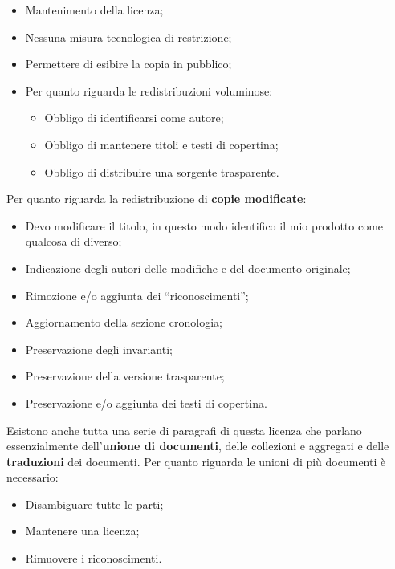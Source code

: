 \begin{itemize}

\item Mantenimento della licenza;
\item Nessuna misura tecnologica di restrizione;
\item Permettere di esibire la copia in pubblico;
\item Per quanto riguarda le redistribuzioni voluminose:
	\begin{itemize}

	\item Obbligo di identificarsi come autore;
	\item Obbligo di mantenere titoli e testi di copertina;
	\item Obbligo di distribuire una sorgente trasparente.

	\end{itemize}

\end{itemize}

Per quanto riguarda la redistribuzione di \textbf{copie modificate}:

\begin{itemize}

\item Devo modificare il titolo, in questo modo identifico il mio prodotto come qualcosa di diverso;
\item Indicazione degli autori delle modifiche e del documento originale;
\item Rimozione e/o aggiunta dei ``riconoscimenti'';
\item Aggiornamento della sezione cronologia;
\item Preservazione degli invarianti;
\item Preservazione della versione trasparente;
\item Preservazione e/o aggiunta dei testi di copertina.

\end{itemize}

Esistono anche tutta una serie di paragrafi di questa licenza che parlano essenzialmente dell'\textbf{unione di documenti}, delle collezioni e aggregati e delle \textbf{traduzioni} dei documenti. Per quanto riguarda le unioni di più documenti è necessario:

\begin{itemize}

\item Disambiguare tutte le parti;
\item Mantenere una licenza;
\item Rimuovere i riconoscimenti.

\end{itemize}

